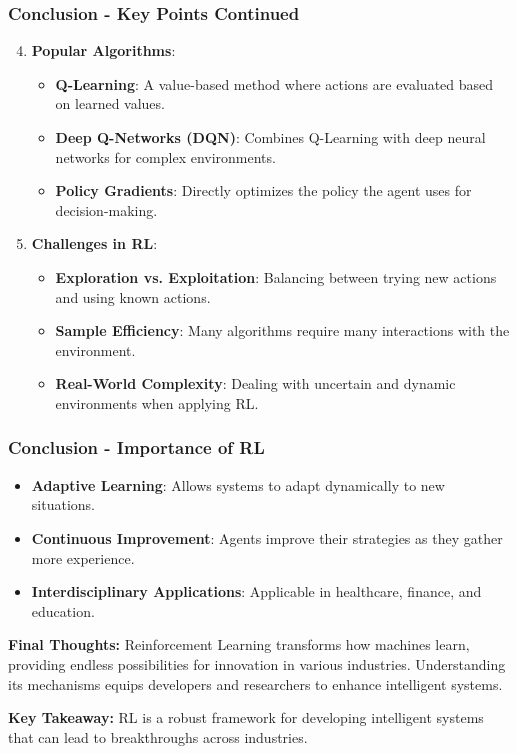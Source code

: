 \documentclass[aspectratio=169]{beamer}
\begin{document}
\begin{frame}[fragile]
    \frametitle{Conclusion - Key Points Continued}
    \begin{enumerate}
        \setcounter{enumi}{3} %
        \item \textbf{Popular Algorithms}:
        \begin{itemize}
            \item \textbf{Q-Learning}: A value-based method where actions are evaluated based on learned values.
            \item \textbf{Deep Q-Networks (DQN)}: Combines Q-Learning with deep neural networks for complex environments.
            \item \textbf{Policy Gradients}: Directly optimizes the policy the agent uses for decision-making.
        \end{itemize}
        
        \item \textbf{Challenges in RL}:
        \begin{itemize}
            \item \textbf{Exploration vs. Exploitation}: Balancing between trying new actions and using known actions.
            \item \textbf{Sample Efficiency}: Many algorithms require many interactions with the environment.
            \item \textbf{Real-World Complexity}: Dealing with uncertain and dynamic environments when applying RL.
        \end{itemize}
    \end{enumerate}
\end{frame}

\begin{frame}[fragile]
    \frametitle{Conclusion - Importance of RL}
    \begin{itemize}
        \item \textbf{Adaptive Learning}: Allows systems to adapt dynamically to new situations.
        \item \textbf{Continuous Improvement}: Agents improve their strategies as they gather more experience.
        \item \textbf{Interdisciplinary Applications}: Applicable in healthcare, finance, and education.
    \end{itemize}
    
    \textbf{Final Thoughts:} Reinforcement Learning transforms how machines learn, providing endless possibilities for innovation in various industries. Understanding its mechanisms equips developers and researchers to enhance intelligent systems.
    
    \textbf{Key Takeaway:} RL is a robust framework for developing intelligent systems that can lead to breakthroughs across industries.
\end{frame}
\end{document}
